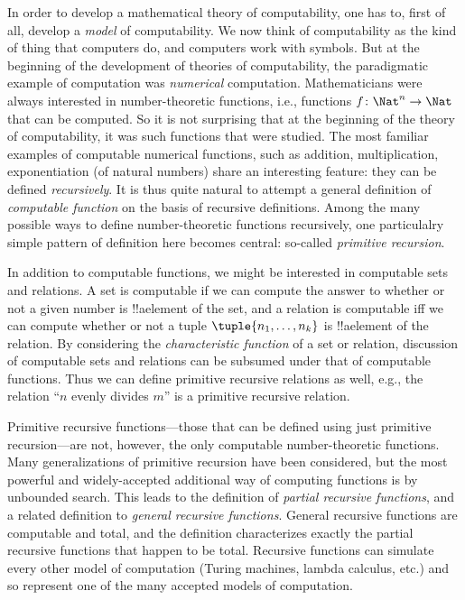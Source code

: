 \documentclass[../../../include/open-logic-section]{subfiles}
\begin{document}

In order to develop a mathematical theory of computability, one has to,
first of all, develop a \emph{model} of computability.  We now think of
computability as the kind of thing that computers do, and computers
work with symbols.  But at the beginning of the development of
theories of computability, the paradigmatic example of computation was
\emph{numerical} computation.  Mathematicians were always interested
in number-theoretic functions, i.e., functions $f\colon \Nat^n \to
\Nat$ that can be computed. So it is not surprising that at the
beginning of the theory of computability, it was such functions that
were studied.  The most familiar examples of computable numerical
functions, such as addition, multiplication, exponentiation (of
natural numbers) share an interesting feature: they can be defined
\emph{recursively}.  It is thus quite natural to attempt a general
definition of \emph{computable function} on the basis of recursive
definitions.  Among the many possible ways to define number-theoretic
functions recursively, one particulalry simple pattern of definition
here becomes central: so-called \emph{primitive recursion}.

In addition to computable functions, we might be interested in
computable sets and relations. A set is computable if we can compute
the answer to whether or not a given number is !!a{element} of the
set, and a relation is computable iff we can compute whether or not a
tuple $\tuple{n_1, \dots, n_k}$ is !!a{element} of the relation.  By
considering the \emph{characteristic function} of a set or relation,
discussion of computable sets and relations can be subsumed under that
of computable functions.  Thus we can define primitive recursive
relations as well, e.g., the relation ``$n$ evenly divides $m$'' is a
primitive recursive relation.

Primitive recursive functions---those that can be defined using just
primitive recursion---are not, however, the only computable
number-theoretic functions. Many generalizations of primitive
recursion have been considered, but the most powerful and
widely-accepted additional way of computing functions is by unbounded
search.  This leads to the definition of \emph{partial recursive
  functions}, and a related definition to \emph{general recursive
  functions}.  General recursive functions are computable and total,
and the definition characterizes exactly the partial recursive
functions that happen to be total.  Recursive functions can simulate
every other model of computation (Turing machines, lambda calculus,
etc.) and so represent one of the many accepted models of computation.
\end{document}
